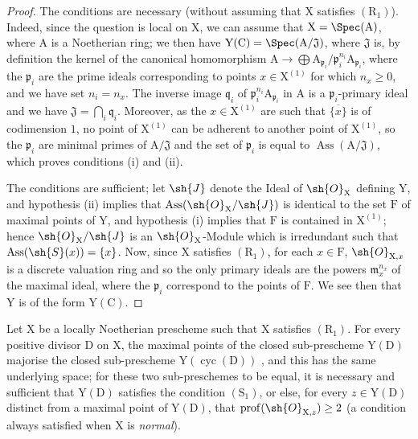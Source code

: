 \begin{proof}
The conditions are necessary (without assuming that $\mathrm{X}$ satisfies $(\mathrm{R}_1)$).
Indeed, since the question is local on $\mathrm{X}$, we can assume that $\mathrm{X}=\Spec(\mathrm{A})$, where $\mathrm{A}$ is a Noetherian ring;
we then have $\mathrm{Y}(\mathrm{C})=\Spec(\mathrm{A}/\mathfrak{J})$, where $\mathfrak{J}$ is, by definition  the kernel of the canonical homomorphism $\mathrm{A}\to\bigoplus\mathrm{A}_{\mathfrak{p}_i}/\mathfrak{p}_i^{n_i}\mathrm{A}_{\mathfrak{p}_i}$, where the $\mathfrak{p}_i$ are the prime ideals corresponding to points $x\in\mathrm{X}^{(1)}$ for which $n_x\geq 0$, and we have set $n_i=n_x$.
The inverse image $\mathfrak{q}_i$ of $\mathfrak{p}_i^{n_i}\mathrm{A}_{\mathfrak{p}_i}$ in $\mathrm{A}$ is a $\mathfrak{p}_i$-primary ideal and we have $\mathfrak{J}=\bigcap_i\mathfrak{q}_i$.
Moreover, as the $x\in\mathrm{X}^{(1)}$ are such that $\overline{\{x\}}$ is of codimension $1$, no point of $\mathrm{X}^{(1)}$ can be adherent to another point of $\mathrm{X}^{(1)}$, so the $\mathfrak{p}_i$ are minimal primes of $\mathrm{A}/\mathfrak{J}$ and the set of $\mathfrak{p}_i$ is equal to $\operatorname{Ass}(\mathrm{A}/\mathfrak{J})$, which proves conditions (i) and (ii).

The conditions are sufficient;
let $\sh{J}$ denote the Ideal of $\sh{O}_\mathrm{X}$ defining $\mathrm{Y}$, and hypothesis (ii) implies that $\operatorname{Ass}(\sh{O}_\mathrm{X}/\sh{J})$ is identical to the set $\mathrm{F}$ of maximal points of $\mathrm{Y}$, and hypothesis (i) implies that $\mathrm{F}$ is contained in $\mathrm{X}^{(1)}$;
hence  $\sh{O}_\mathrm{X}/\sh{J}$ is an $\sh{O}_\mathrm{X}$-Module which is irredundant such that $\operatorname{Ass}(\sh{S}(x))=\{x\}$.
Now, since $\mathrm{X}$ satisfies $(\mathrm{R}_1)$, for each $x\in\mathrm{F}$, $\sh{O}_{\mathrm{X},x}$ is a discrete valuation ring and so the only primary ideals are the powers $\mathfrak{m}_x^{n_x}$ of the maximal ideal, where the $\mathfrak{p}_i$ correspond to the points of $\mathrm{F}$.
We see then that $\mathrm{Y}$ is of the form $\mathrm{Y}(\mathrm{C})$.
\end{proof}

\begin{corollary}[21.7.3]
\label{IV.21.7.3}
Let $\mathrm{X}$ be a locally Noetherian prescheme such that $\mathrm{X}$ satisfies $(\mathrm{R}_1)$.
For every positive divisor $\mathrm{D}$ on $\mathrm{X}$, the maximal points of the closed sub-prescheme $\mathrm{Y}(\mathrm{D})$  majorise the closed sub-prescheme $\mathrm{Y}(\operatorname{cyc}(\mathrm{D}))$ , and this has the same underlying space;
for these two sub-preschemes to be equal, it is necessary and sufficient that $\mathrm{Y}(\mathrm{D})$ satisfies the condition $(\mathrm{S}_1)$, or else, for every $z\in\mathrm{Y}(\mathrm{D})$ distinct from a maximal point of $\mathrm{Y}(\mathrm{D})$, that $\operatorname{prof}(\sh{O}_{\mathrm{X},z})\geq 2$ (a condition always satisfied when $\mathrm{X}$ is \emph{normal}).
\end{corollary}

